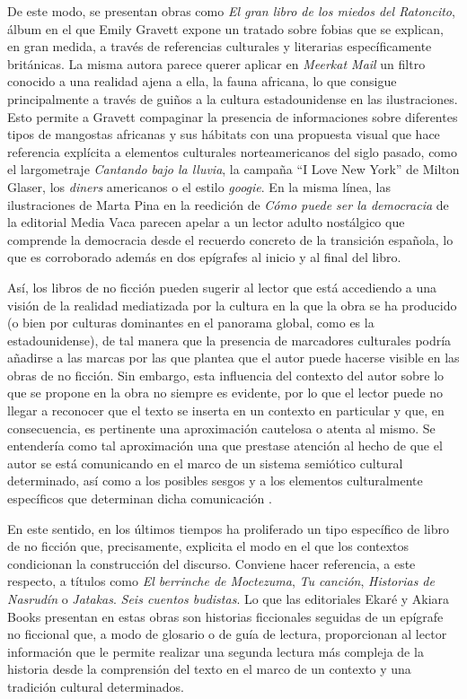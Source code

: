 \documentclass[spanish]{textolivre}
\begin{document}
De este modo, se presentan obras como \textit{El gran libro de los miedos del Ratoncito}, álbum en el que Emily Gravett expone un tratado sobre fobias que se explican, en gran medida, a través de referencias culturales y literarias específicamente británicas. La misma autora parece querer aplicar en \textit{Meerkat Mail} un filtro conocido a una realidad ajena a ella, la fauna africana, lo que consigue principalmente a través de guiños a la cultura estadounidense en las ilustraciones. Esto permite a Gravett compaginar la presencia de informaciones sobre diferentes tipos de mangostas africanas y sus hábitats con una propuesta visual que hace referencia explícita a elementos culturales norteamericanos del siglo pasado, como el largometraje \textit{Cantando bajo la lluvia}, la campaña “I Love New York” de Milton Glaser, los \textit{diners} americanos o el estilo \textit{googie}. En la misma línea, las ilustraciones de Marta Pina en la reedición de \textit{Cómo puede ser la democracia} de la editorial Media Vaca parecen apelar a un lector adulto nostálgico que comprende la democracia desde el recuerdo concreto de la transición española, lo que es corroborado además en dos epígrafes al inicio y al final del libro.

Así, los libros de no ficción pueden sugerir al lector que está accediendo a una visión de la realidad mediatizada por la cultura en la que la obra se ha producido (o bien por culturas dominantes en el panorama global, como es la estadounidense), de tal manera que la presencia de marcadores culturales podría añadirse a las marcas por las que \textcite{sanders_literature_2017} plantea que el autor puede hacerse visible en las obras de no ficción. Sin embargo, esta influencia del contexto del autor sobre lo que se propone en la obra no siempre es evidente, por lo que el lector puede no llegar a reconocer que el texto se inserta en un contexto en particular y que, en consecuencia, es pertinente una aproximación cautelosa o atenta al mismo. Se entendería como tal aproximación una que prestase atención al hecho de que el autor se está comunicando en el marco de un sistema semiótico cultural determinado, así como a los posibles sesgos y a los elementos culturalmente específicos que determinan dicha comunicación \cite{osullivan_comparative_2005}.

En este sentido, en los últimos tiempos ha proliferado un tipo específico de libro de no ficción que, precisamente, explicita el modo en el que los contextos condicionan la construcción del discurso. Conviene hacer referencia, a este respecto, a títulos como \textit{El berrinche de Moctezuma}, \textit{Tu canción}, \textit{Historias de Nasrudín} o \textit{Jatakas}. \textit{Seis cuentos budistas}. Lo que las editoriales Ekaré y Akiara Books presentan en estas obras son historias ficcionales seguidas de un epígrafe no ficcional que, a modo de glosario o de guía de lectura, proporcionan al lector información que le permite realizar una segunda lectura más compleja de la historia desde la comprensión del texto en el marco de un contexto y una tradición cultural determinados.
\end{document}
